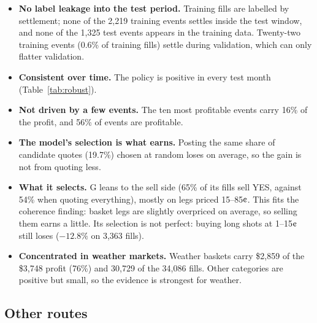 \documentclass[11pt,a4paper]{article}
\newcommand{\cent}{\text{\textcent}}
\begin{document}
\begin{itemize}
  \item \textbf{No label leakage into the test period.} Training fills are labelled by settlement; none of the 2{,}219
    training events settles inside the test window, and none of the 1{,}325 test events appears in the training data.
    Twenty-two training events (0.6\% of training fills) settle during validation, which can only flatter validation.
  \item \textbf{Consistent over time.} The policy is positive in every test month (Table~\ref{tab:robust}).
  \item \textbf{Not driven by a few events.} The ten most profitable events carry 16\% of the profit, and 56\% of
    events are profitable.
  \item \textbf{The model's selection is what earns.} Posting the same share of candidate quotes (19.7\%) chosen at
    random loses on average, so the gain is not from quoting less.
  \item \textbf{What it selects.} G leans to the sell side (65\% of its fills sell YES, against 54\% when quoting
    everything), mostly on legs priced 15--85$\cent$. This fits the coherence finding: basket legs are slightly
    overpriced on average, so selling them earns a little. Its selection is not perfect: buying long shots at
    1--15$\cent$ still loses ($-12.8\%$ on 3{,}363 fills).
  \item \textbf{Concentrated in weather markets.} Weather baskets carry \$2{,}859 of the \$3{,}748 profit (76\%) and
    30{,}729 of the 34{,}086 fills. Other categories are positive but small, so the evidence is strongest for weather.
\end{itemize}

\subsection{Other routes}\label{sec:res-other}
\end{document}
